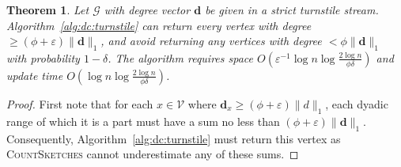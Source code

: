 \documentclass{report}
\newtheorem{theorem}{Theorem}[section]
\newcommand{\algoname}[1]{\textnormal{\textsc{#1}}}
\begin{document}
\begin{theorem} \label{thm:dchh:turnstile}
Let $\mathcal{G}$ with degree vector $\mathbf{d}$ be given in a strict turnstile stream.
Algorithm~\ref{alg:dc:turnstile} can return every vertex with degree $\geq (\phi + \varepsilon)\|\mathbf{d}\|_1$, and avoid returning any vertices with degree $< \phi\|\mathbf{d}\|_1$ with probability $1-\delta$.
The algorithm requires space $O \left ( \varepsilon^{-1} \log n \log \frac{2 \log n}{\phi\delta} \right )$ and update time $O \left ( \log n \log \frac{2 \log n}{\phi \delta} \right )$.
\end{theorem}

\begin{proof}
First note that for each $x \in \mathcal{V}$ where $\mathbf{d}_x \geq (\phi + \varepsilon) \|d\|_1$, each dyadic range of which it is a part must have a sum no less than $(\phi + \varepsilon) \|\mathbf{d}\|_1$. 
Consequently, Algorithm~\ref{alg:dc:turnstile} must return this vertex as \algoname{CountSketches} cannot underestimate any of these sums.


\end{proof}
\end{document}
